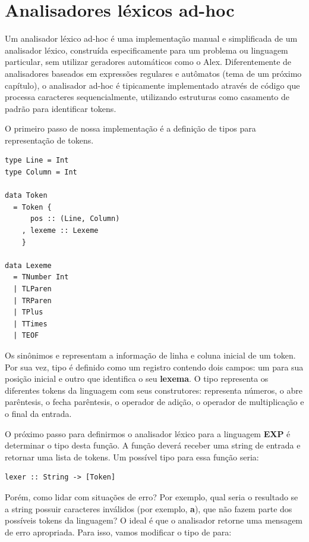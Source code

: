 \section{Analisadores léxicos ad-hoc}

Um analisador léxico ad-hoc é uma implementação manual e simplificada
de um analisador léxico, construída especificamente para um problema
ou linguagem particular, sem utilizar geradores automáticos como o
Alex. Diferentemente de analisadores baseados em expressões regulares
e autômatos (tema de um próximo capítulo), o analisador ad-hoc é
tipicamente implementado através de código que processa caracteres
sequencialmente, utilizando estruturas como casamento de padrão para
identificar tokens.

O primeiro passo de nossa implementação é a definição de tipos para
representação de tokens.

\begin{verbatim}
type Line = Int
type Column = Int

data Token
  = Token {
      pos :: (Line, Column)
    , lexeme :: Lexeme
    }

data Lexeme
  = TNumber Int
  | TLParen
  | TRParen
  | TPlus
  | TTimes
  | TEOF
\end{verbatim}

Os sinônimos  e
 representam a informação de linha e
coluna inicial de um token. Por sua vez, tipo
 é definido como um registro contendo
dois campos: um para sua posição inicial e outro que identifica o seu
\textbf{lexema}. O tipo  representa
os diferentes tokens da linguagem com seus construtores:
 representa números,
 o abre parêntesis,
 o fecha parêntesis,
 o operador de adição,
 o operador de multiplicação e
 o final da entrada.

O próximo passo para definirmos o analisador léxico para a linguagem
\textbf{EXP} é determinar o tipo desta função. A função deverá
receber uma string de entrada e retornar uma lista de tokens. Um
possível tipo para essa função seria:

\begin{verbatim}
lexer :: String -> [Token]
\end{verbatim}

Porém, como lidar com situações de erro? Por exemplo, qual seria o
resultado se a string possuir caracteres inválidos (por exemplo,
\textbf{a}), que não fazem parte dos possíveis tokens da linguagem? O
ideal é que o analisador retorne uma mensagem de erro apropriada.
Para isso, vamos modificar o tipo de  para:

